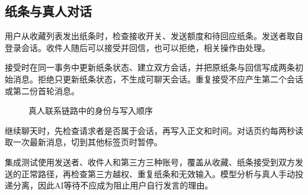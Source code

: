 \subsection*{纸条与真人对话}
用户从收藏列表发出纸条时，检查接收开关、发送额度和待回应纸条。发送者取自登录会话。收件人随后可以接受并回信，也可以拒绝，相关操作由处理。

接受时在同一事务中更新纸条状态、建立双方会话，并把原纸条与回信写成两条初始消息。拒绝只更新纸条状态，不生成可聊天会话。重复接受不应产生第二个会话或第二份首轮消息。

\begin{figure}[H]\centering
{}\caption{真人联系链路中的身份与写入顺序}\end{figure}

继续聊天时，先检查请求者是否属于会话，再写入正文和时间。对话页约每两秒读取一次最新消息，切到其他标签页时暂停。

集成测试使用发送者、收件人和第三方三种账号，覆盖从收藏、纸条接受到双方发送的正常路径，再检查第三方越权、重复纸条和无效输入。模型分析与真人手动投递分离，因此AI等待不应成为阻止用户自行发言的理由。
